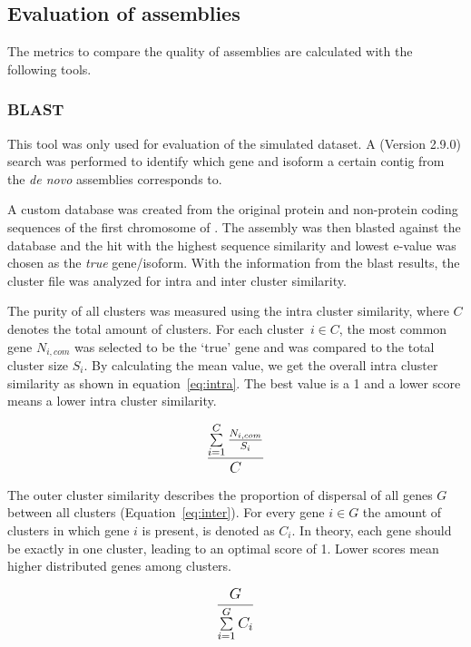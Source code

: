 \documentclass[12pt,a4paper,english]{article}
\begin{document}
\subsection{Evaluation of assemblies}
	\label{ssec:evaluation}
	The metrics to compare the quality of assemblies are calculated with the following tools.

\subsubsection*{BLAST}
	This tool was only used for evaluation of the simulated dataset.
	A \blast (Version 2.9.0) \citep{blast:90} search was performed to identify which gene and isoform a certain contig from the \textit{de novo} assemblies corresponds to.
	
	A custom database was created from the original protein and non-protein coding sequences of the first chromosome of \celegans.
	The assembly was then blasted against the database and the hit with the highest sequence similarity and lowest e-value was chosen as the \textit{true} gene/isoform. With the information from the blast results, the cluster file was analyzed for intra and inter cluster similarity.
	
	The purity of all clusters was measured using the intra cluster similarity, where $ C $ denotes the total amount of clusters. For each cluster~$ i \in C $, the most common gene $ N_{i, com} $ was selected to be the `true' gene and was compared to the total cluster size $ S_{i} $. By calculating the mean value, we get the overall intra cluster similarity as shown in equation~\ref{eq:intra}. The best value is a 1 and a lower score means a lower intra cluster similarity.
 
	\begin{equation}
		\label{eq:intra}
		\mathlarger{\frac{\sum\limits_{i=1}^{C}\frac{N_{i, com}}{S_{i}}}{C} }
	\end{equation}

	The outer cluster similarity describes the proportion of dispersal of all genes $G$ between all clusters (Equation~\ref{eq:inter}). For every gene $i \in G$ the amount of clusters in which gene $i$ is present, is denoted as $ C_{i} $. In theory, each gene should be exactly in one cluster, leading to an optimal score of 1. Lower scores mean higher distributed genes among clusters.

	
	\begin{equation}
	\label{eq:inter}
	\mathlarger{\frac{G}{\sum\limits_{i=1}^{G} C_{i} }}  
	\end{equation}
\end{document}
